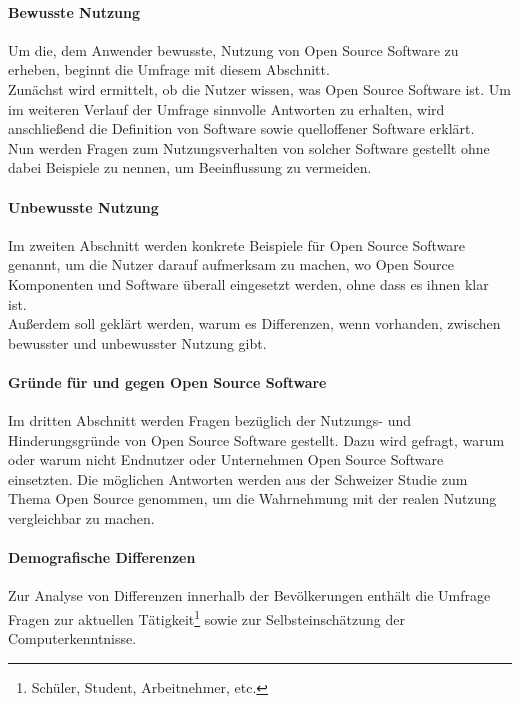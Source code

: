\documentclass[a4paper]{article}
\begin{document}
    			\paragraph{Bewusste Nutzung}
    				Um die, dem Anwender bewusste, Nutzung von Open Source Software zu erheben, beginnt die Umfrage mit diesem Abschnitt.\\
    				Zunächst wird ermittelt, ob die Nutzer wissen, was Open Source Software ist. Um im weiteren Verlauf der Umfrage sinnvolle Antworten zu erhalten, wird anschließend die Definition von Software sowie quelloffener Software erklärt.\\
    				Nun werden Fragen zum Nutzungsverhalten von solcher Software gestellt ohne dabei Beispiele zu nennen, um Beeinflussung zu vermeiden.
    			
    			\paragraph{Unbewusste Nutzung}
    				Im zweiten Abschnitt werden konkrete Beispiele für Open Source Software genannt, um die Nutzer darauf aufmerksam zu machen, wo Open Source Komponenten und Software überall eingesetzt werden, ohne dass es ihnen klar ist.\\
    				Außerdem soll geklärt werden, warum es Differenzen, wenn vorhanden, zwischen bewusster und unbewusster Nutzung gibt.
    			
    			\paragraph{Gründe für und gegen Open Source Software}
    				Im dritten Abschnitt werden Fragen bezüglich der Nutzungs- und Hinderungsgründe von Open Source Software gestellt. Dazu wird gefragt, warum oder warum nicht Endnutzer oder Unternehmen Open Source Software einsetzten. Die möglichen Antworten werden aus der Schweizer Studie zum Thema Open Source\cite{oss:studie} genommen, um die Wahrnehmung mit der realen Nutzung vergleichbar zu machen.
    			
    			\paragraph{Demografische Differenzen}
    				Zur Analyse von Differenzen innerhalb der Bevölkerungen enthält die Umfrage Fragen zur aktuellen Tätigkeit\footnote{Schüler, Student, Arbeitnehmer, etc.} sowie zur Selbsteinschätzung der Computerkenntnisse.
				
\end{document}

